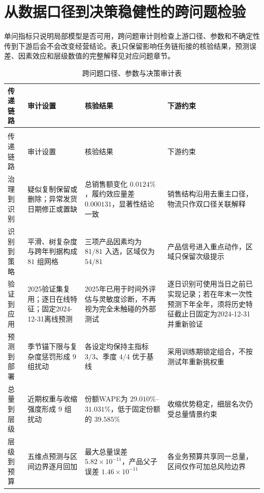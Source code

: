 \section{从数据口径到决策稳健性的跨问题检验}
\label{sec:cross-validation}

单问指标只说明局部模型是否可用，跨问题审计则检查上游口径、参数和不确定性传到下游后会不会改变经营结论。表\ref{tab:cross-checks}只保留影响任务链衔接的核验结果，预测误差、因素效应和层级数值的完整解释见对应问题章节。

\begin{longtable}{>{\centering\arraybackslash}p{}>{\centering\arraybackslash}p{}>{\centering\arraybackslash}p{}>{\centering\arraybackslash}p{}}
\caption{跨问题口径、参数与决策审计表}\label{tab:cross-checks}\\
\toprule
传递链路 & 审计设置 & 核验结果 & 下游约束 \\
\midrule
\endfirsthead
\multicolumn{4}{c}{续表~\thetable}\\
\toprule
传递链路 & 审计设置 & 核验结果 & 下游约束 \\
\midrule
\endhead
\bottomrule
\endfoot
治理到识别 & 疑似复制保留或删除；异常发货日期修正或置缺 & 总销售额变化 $0.0124\%$，履约效应量差 $0.000131$，显著性结论一致 & 销售结构沿用去重主口径，物流只作双口径关联解释 \\ %
识别到策略 & 平滑、树复杂度与跨年判据构成 $81$ 组网格 & 三项产品因素均为 $81/81$ 入选，区域仅为 $54/81$ & 产品信号进入重点动作，区域只保留次级提示 \\ %
验证到应用 & 2025验证集复用；逐日在线特征；固定2024-12-31离线预测 & 2025年已用于时间外评估与灵敏度诊断，不再视为完全未触碰的外部测试 & 逐日识别可使用当日之前已实现记录；若在年末一次性预测下年全年，须将历史特征截止日固定为2024-12-31并重新验证 \\ %
预测到部署 & 季节锚下限与复杂度惩罚形成 $9$ 组扰动 & 各设定均保持主指标 $3/3$、季度 $4/4$ 优于基线 & 采用训练期锁定组合，不按测试年重新挑权重 \\ %
总量到层级 & 近期权重与收缩强度形成 $9$ 组扰动 & 份额WAPE为 $29.010\%$--$31.031\%$，低于固定份额的 $39.585\%$ & 收缩优势稳定，细层名次仍受总量情景约束 \\ %
层级到预算 & 五维点预测与区间边界逐月回加 & 最大总量误差 $5.82\times10^{-11}$，产品父子误差 $1.46\times10^{-11}$ & 各业务预算共享同一总量，区间仅作可加总风险边界 \\ %
\end{longtable}

